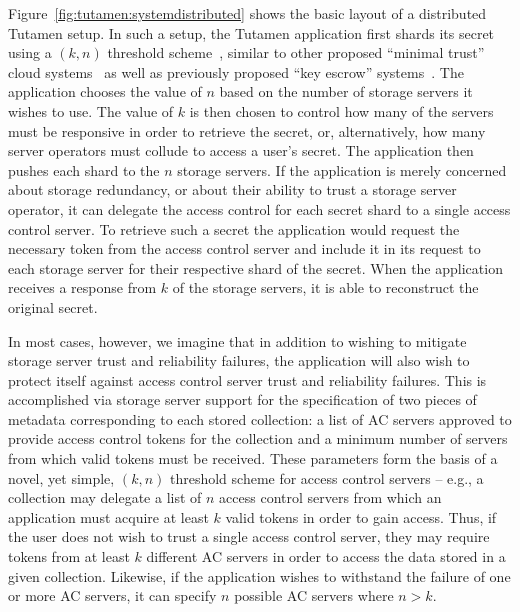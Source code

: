 Figure~\ref{fig:tutamen:systemdistributed} shows the basic layout of a
distributed Tutamen setup. In such a setup, the Tutamen application
first shards its secret using a $(k, n)$ threshold
scheme~\cite{krawczyk1993, shamir1979}, similar to other proposed
``minimal trust'' cloud systems~\cite{bessani2011} as well as
previously proposed ``key escrow'' systems~\cite{blaze1996,
  denning1996}. The application chooses the value of $n$ based on the
number of storage servers it wishes to use. The value of $k$ is then
chosen to control how many of the servers must be responsive in order
to retrieve the secret, or, alternatively, how many server operators
must collude to access a user's secret. The application then pushes
each shard to the $n$ storage servers. If the application is merely
concerned about storage redundancy, or about their ability to trust a
storage server operator, it can delegate the access control for each
secret shard to a single access control server. To retrieve such a
secret the application would request the necessary token from the
access control server and include it in its request to each storage
server for their respective shard of the secret. When the application
receives a response from $k$ of the storage servers, it is able to
reconstruct the original secret.

In most cases, however, we imagine that in addition to wishing to
mitigate storage server trust and reliability failures, the
application will also wish to protect itself against access control
server trust and reliability failures. This is accomplished via
storage server support for the specification of two pieces of metadata
corresponding to each stored collection: a list of AC servers approved
to provide access control tokens for the collection and a minimum
number of servers from which valid tokens must be received. These
parameters form the basis of a novel, yet simple, $(k, n)$ threshold
scheme for access control servers -- e.g., a collection may delegate a
list of $n$ access control servers from which an application must
acquire at least $k$ valid tokens in order to gain access. Thus, if
the user does not wish to trust a single access control server, they
may require tokens from at least $k$ different AC servers in order to
access the data stored in a given collection. Likewise, if the
application wishes to withstand the failure of one or more AC servers,
it can specify $n$ possible AC servers where $n > k$.

